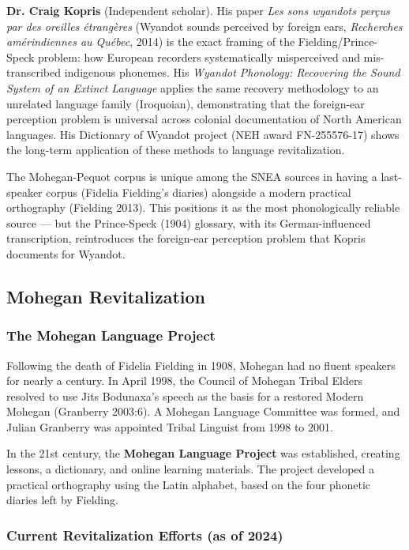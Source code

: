 \textbf{Dr. Craig Kopris} (Independent scholar). His paper \emph{Les sons
wyandots perçus par des oreilles étrangères} (Wyandot sounds perceived by
foreign ears, \emph{Recherches amérindiennes au Québec}, 2014) is the exact
framing of the Fielding/Prince-Speck problem: how European recorders
systematically misperceived and mis-transcribed indigenous phonemes. His
\emph{Wyandot Phonology: Recovering the Sound System of an Extinct Language}
applies the same recovery methodology to an unrelated language family
(Iroquoian), demonstrating that the foreign-ear perception problem is
universal across colonial documentation of North American languages. His
Dictionary of Wyandot project (NEH award FN-255576-17) shows the long-term
application of these methods to language revitalization.

The Mohegan-Pequot corpus is unique among the SNEA sources in having a
last-speaker corpus (Fidelia Fielding's diaries) alongside a modern practical
orthography (Fielding 2013). This positions it as the most phonologically
reliable source --- but the Prince-Speck (1904) glossary, with its
German-influenced transcription, reintroduces the foreign-ear perception
problem that Kopris documents for Wyandot.

\subsection{Mohegan Revitalization}

\subsubsection{The Mohegan Language Project}

Following the death of Fidelia Fielding in 1908, Mohegan had no fluent
speakers for nearly a century. In April 1998, the Council of Mohegan Tribal
Elders resolved to use Jits Bodunaxa's speech as the basis for a restored
Modern Mohegan (Granberry 2003:6). A Mohegan Language Committee was formed,
and Julian Granberry was appointed Tribal Linguist from 1998 to 2001.

In the 21st century, the \textbf{Mohegan Language Project} was established,
creating lessons, a dictionary, and online learning materials. The project
developed a practical orthography using the Latin alphabet, based on the four
phonetic diaries left by Fielding.

\subsubsection{Current Revitalization Efforts (as of 2024)}

